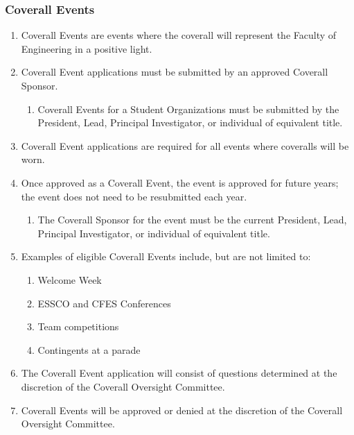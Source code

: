 \subsubsection{Coverall Events}
\label{coverall-events}
\begin{enumerate}
 \item
  Coverall Events are events where the coverall will represent the
  Faculty of Engineering in a positive light.
 \item
  Coverall Event applications must be submitted by an approved Coverall
  Sponsor.

  \begin{enumerate}
   \item
    Coverall Events for a Student Organizations must be submitted by the
    President, Lead, Principal Investigator, or individual of equivalent
    title.
  \end{enumerate}
 \item
  Coverall Event applications are required for all events where
  coveralls will be worn.
 \item
  Once approved as a Coverall Event, the event is approved for future
  years; the event does not need to be resubmitted each year.

  \begin{enumerate}
   \item
    The Coverall Sponsor for the event must be the current President,
    Lead, Principal Investigator, or individual of equivalent title.
  \end{enumerate}
 \item
  Examples of eligible Coverall Events include, but are not limited to:

  \begin{enumerate}
   \item
    Welcome Week
   \item
    ESSCO and CFES Conferences
   \item
    Team competitions
   \item
    Contingents at a parade
  \end{enumerate}
 \item
  The Coverall Event application will consist of questions determined at
  the discretion of the Coverall Oversight Committee.
 \item
  Coverall Events will be approved or denied at the discretion of the
  Coverall Oversight Committee.

\end{enumerate}

